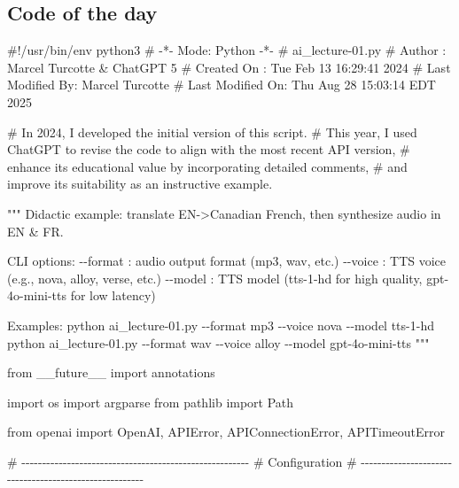 \documentclass[
  letterpaper,
  DIV=11,
  numbers=noendperiod]{scrartcl}
\newenvironment{Shaded}{\begin{snugshade}}{\end{snugshade}}
\newcommand{\CommentTok}[1]{\textcolor[rgb]{0.37,0.37,0.37}{#1}}
\newcommand{\ImportTok}[1]{\textcolor[rgb]{0.00,0.46,0.62}{#1}}
\newcommand{\NormalTok}[1]{\textcolor[rgb]{0.00,0.23,0.31}{#1}}
\begin{document}
\subsection{Code of the day}\label{code-of-the-day}

\begin{Shaded}
\begin{Highlighting}[]
\CommentTok{\#!/usr/bin/env python3}
\CommentTok{\# {-}*{-} Mode: Python {-}*{-}}
\CommentTok{\# ai\_lecture{-}01.py}
\CommentTok{\# Author          : Marcel Turcotte \& ChatGPT 5}
\CommentTok{\# Created On      : Tue Feb 13 16:29:41 2024}
\CommentTok{\# Last Modified By: Marcel Turcotte}
\CommentTok{\# Last Modified On: Thu Aug 28 15:03:14 EDT 2025}

\CommentTok{\# In 2024, I developed the initial version of this script. }
\CommentTok{\# This year, I used ChatGPT to revise the code to align with the most recent API version, }
\CommentTok{\# enhance its educational value by incorporating detailed comments, }
\CommentTok{\# and improve its suitability as an instructive example.}

\CommentTok{"""}
\CommentTok{Didactic example: translate EN{-}\textgreater{}Canadian French, then synthesize audio in EN \& FR.}

\CommentTok{CLI options:}
\CommentTok{    {-}{-}format : audio output format (mp3, wav, etc.)}
\CommentTok{    {-}{-}voice  : TTS voice (e.g., nova, alloy, verse, etc.)}
\CommentTok{    {-}{-}model  : TTS model (tts{-}1{-}hd for high quality, gpt{-}4o{-}mini{-}tts for low latency)}

\CommentTok{Examples:}
\CommentTok{    python ai\_lecture{-}01.py {-}{-}format mp3 {-}{-}voice nova {-}{-}model tts{-}1{-}hd}
\CommentTok{    python ai\_lecture{-}01.py {-}{-}format wav {-}{-}voice alloy {-}{-}model gpt{-}4o{-}mini{-}tts}
\CommentTok{"""}

\ImportTok{from}\NormalTok{ \_\_future\_\_ }\ImportTok{import}\NormalTok{ annotations}

\ImportTok{import}\NormalTok{ os}
\ImportTok{import}\NormalTok{ argparse}
\ImportTok{from}\NormalTok{ pathlib }\ImportTok{import}\NormalTok{ Path}

\ImportTok{from}\NormalTok{ openai }\ImportTok{import}\NormalTok{ OpenAI, APIError, APIConnectionError, APITimeoutError}

\CommentTok{\# {-}{-}{-}{-}{-}{-}{-}{-}{-}{-}{-}{-}{-}{-}{-}{-}{-}{-}{-}{-}{-}{-}{-}{-}{-}{-}{-}{-}{-}{-}{-}{-}{-}{-}{-}{-}{-}{-}{-}{-}{-}{-}{-}{-}{-}{-}{-}{-}{-}{-}{-}{-}{-}{-}{-}}
\CommentTok{\# Configuration}
\CommentTok{\# {-}{-}{-}{-}{-}{-}{-}{-}{-}{-}{-}{-}{-}{-}{-}{-}{-}{-}{-}{-}{-}{-}{-}{-}{-}{-}{-}{-}{-}{-}{-}{-}{-}{-}{-}{-}{-}{-}{-}{-}{-}{-}{-}{-}{-}{-}{-}{-}{-}{-}{-}{-}{-}{-}{-}}


\end{Highlighting}
\end{Shaded}
\end{document}
